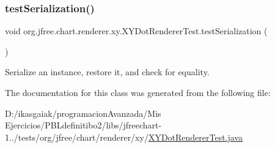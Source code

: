 \subsubsection{\texorpdfstring{test\+Serialization()}{testSerialization()}}
{\footnotesize\ttfamily void org.\+jfree.\+chart.\+renderer.\+xy.\+X\+Y\+Dot\+Renderer\+Test.\+test\+Serialization (\begin{DoxyParamCaption}{ }\end{DoxyParamCaption})}

Serialize an instance, restore it, and check for equality. 

The documentation for this class was generated from the following file\+:\begin{DoxyCompactItemize}
\item 
D\+:/ikasgaiak/programacion\+Avanzada/\+Mis Ejercicios/\+P\+B\+Ldefinitibo2/libs/jfreechart-\/1../tests/org/jfree/chart/renderer/xy/\mbox{\hyperlink{_x_y_dot_renderer_test_8java}{X\+Y\+Dot\+Renderer\+Test.\+java}}\end{DoxyCompactItemize}
